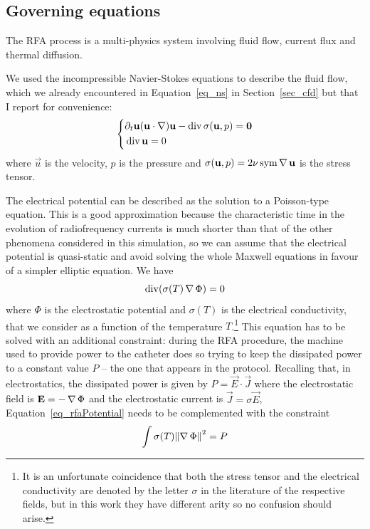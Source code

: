 \subsection{Governing equations}
\label{sub_rfaEquations}
The RFA process is a multi-physics system involving fluid flow, current flux and thermal diffusion.

We used the incompressible Navier-Stokes equations to describe the fluid flow, which we already encountered in Equation~\eqref{eq_ns} in Section~\ref{sec_cfd} but that I report for convenience:
\begin{equation}
  \left\{
    \begin{aligned}
      &\partial_{t} \mathbf{u} (\mathbf{u} \cdot \operatorname{\nabla}) \mathbf{u} - \operatorname{div}\sigma(\mathbf{u},p) = \mathbf{0} \\
      &\operatorname{div} \mathbf{u} = 0
    \end{aligned}
  \right.
  \label{eq_rfaNS}
\end{equation}
where \(\vec{u}\) is the velocity, \(p\) is the pressure and \(\sigma(\mathbf{u},p) = 2 \nu \operatorname{sym}\operatorname{\nabla} \mathbf{u}\) is the stress tensor.

The electrical potential can be described as the solution to a Poisson-type equation.
This is a good approximation because the characteristic time in the evolution of radiofrequency currents is much shorter than that of the other phenomena considered in this simulation, so we can assume that the electrical potential is quasi-static and avoid solving the whole Maxwell equations in favour of a simpler elliptic equation.
We have
\begin{equation}
  \operatorname{div}(\sigma(T)\operatorname{\nabla}\Phi) = 0
  \label{eq_rfaPotential}
\end{equation}
where \(\Phi\) is the electrostatic potential and \(\sigma(T)\) is the electrical conductivity, that we consider as a function of the temperature \(T\).\footnote{It is an unfortunate coincidence that both the stress tensor and the electrical conductivity are denoted by the letter \(\sigma\) in the literature of the respective fields, but in this work they have different arity so no confusion should arise.}
This equation has to be solved with an additional constraint: during the RFA procedure, the machine used to provide power to the catheter does so trying to keep the dissipated power to a constant value \(P\) -- the one that appears in the protocol.
Recalling that, in electrostatics, the dissipated power is given by \(P = \vec{E} \cdot \vec{J}\) where the electrostatic field is \(\mathbf{E} = -\operatorname{\nabla}\Phi\) and the electrostatic current is \(\vec{J} = \sigma \vec{E}\), Equation~\eqref{eq_rfaPotential} needs to be complemented with the constraint
\begin{equation}
  \int \sigma(T) \norm*{\grad\Phi}^2 = P
  \label{eq_rfaPowerConstraint}
\end{equation}

